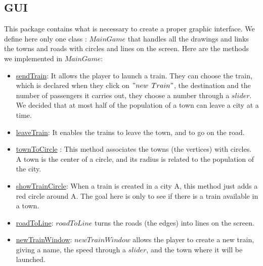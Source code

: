 \documentclass[a4paper]{article}
\begin{document}
	\subsection{GUI}
	This package contains what is necessary to create a proper graphic interface. We define here only one class : $MainGame$ that handles all the drawings and links the towns and roads with circles and lines on the screen.
	Here are the methods we implemented in $MainGame$:
	\begin{itemize}
		\item \underline{sendTrain}: It allows the player to launch a train. They can choose the train, which is declared when they click on $"new$ $Train"$, the destination and the number of passengers it carries out, they choose a number through a $slider$. We decided that at most half of the population of a town can leave a city at a time.

		\item \underline{leaveTrain}: It enables the trains to leave the town, and to go on the road.

		\item \underline{townToCircle} : This method associates the towns (the vertices) with circles. A town is the center of a circle, and its radius is related to the population of the city.

		\item \underline{showTrainCircle}: When a train is created in a city A, this method just adds a red circle around A. The goal here is only to see if there is a train available in a town.

		\item \underline{roadToLine}: $roadToLine$ turns  the roads (the edges) into lines on the screen.

		\item \underline{newTrainWindow}: $newTrainWindow$ allows the player to create a new train, giving a name, the speed through a $slider$, and the town where it will be launched.

	\end{itemize}
\end{document}
